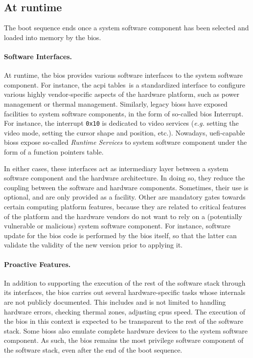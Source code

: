 \subsection{At runtime}
\label{subsec:usecase:firm:runtime}

The boot sequence ends once a system software component has been selected and
loaded into memory by the \ac{bios}.

\paragraph{Software Interfaces.}
At runtime, the \ac{bios} provides various software interfaces to the system
software component.
%
For instance, the \ac{acpi} tables\,\cite{uefi2017acpi,duflot2010acpi} is a
standardized interface to configure various highly vendor-specific aspects of
the hardware platform, such as power management or thermal management.
%
Similarly, legacy \acp{bios} have exposed facilities to system software
components, in the form of so-called \ac{bios} Interrupt.
%
For instance, the interrupt \texttt{0x10} is dedicated to video services
(\emph{e.g.} setting the video mode, setting the cursor shape and position,
etc.).
%
Nowadays, \ac{uefi}-capable \acp{bios} expose so-called \emph{Runtime Services}
to system software component\cite[Chapter 5]{zimmer2017uefi} under the form of a
function pointers table.

In either cases, these interfaces act as intermediary layer between a system
software component and the hardware architecture.
%
In doing so, they reduce the coupling between the software and hardware
components.
%
Sometimes, their use is optional, and are only provided as a facility.
%
Other are mandatory gates towards certain computing platform features, because
they are related to critical features of the platform and the hardware vendors
do not want to rely on a (potentially vulnerable or malicious) system software
component.
%
For instance, software update for the \ac{bios} code is performed by the
\ac{bios} itself, so that the latter can validate the validity of the new
version prior to applying it.

\paragraph{Proactive Features.}
%
In addition to supporting the execution of the rest of the software stack
through its interfaces, the \ac{bios} carries out several hardware-specific
tasks whose internals are not publicly documented.
%
This includes and is not limited to handling hardware errors, checking thermal
zones, adjusting \acp{cpu} speed.
%
The execution of the \ac{bios} in this context is expected to be transparent to
the rest of the software stack.
%
Some \acp{bios} also emulate complete hardware devices to the system software
component.
%
As such, the \ac{bios} remains the most privilege software component of the
software stack, even after the end of the boot sequence.

